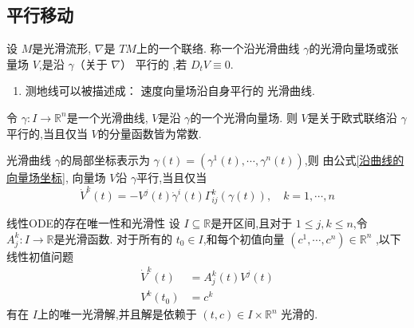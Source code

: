 \documentclass[../../main.tex]{subfiles}
\begin{document}
\subsection{平行移动}

\begin{definition}
    设 \(  M  \)是光滑流形, \(   \nabla   \)是 \(  TM  \)上的一个联络.
    称一个沿光滑曲线 \(   \gamma   \)的光滑向量场或张量场 \(  V  \),是沿 \(   \gamma   \)（关于 \(   \nabla   \)） 平行的       ,若 \(  D_{t}V \equiv 0  \). 
\end{definition}

\begin{remark}
    \begin{enumerate}
        \item 测地线可以被描述成： 速度向量场沿自身平行的 光滑曲线.
    \end{enumerate}
    
\end{remark}
\begin{example}
    令 \(   \gamma :I\to \mathbb{R} ^{n}  \)是一个光滑曲线, \(  V  \)是沿 \(   \gamma   \)的一个光滑向量场.
    则 \(  V  \)是关于欧式联络沿 \(   \gamma   \)平行的,当且仅当 \(  V  \)的分量函数皆为常数.      
\end{example}

\hspace*{\fill} 

\begin{proposition}
    光滑曲线 \(   \gamma   \)的局部坐标表示为 \(   \gamma \left( t \right) =  \left(  \gamma ^{1}\left( t \right),\cdots , \gamma ^{n}\left( t \right)   \right)    \),则
    由公式\ref{沿曲线的向量场坐标},
    向量场 \(  V  \)沿 \(   \gamma   \)平行,当且仅当 \[
    \dot{V}^{k}\left( t \right) =  -V^{j}\left( t \right)  \dot{\gamma}^{i}\left( t \right) \Gamma _{ij}^{k}\left(  \gamma \left( t \right)  \right)    ,\quad  k=  1,\cdots,n 
    \]     
\end{proposition}


\begin{theorem}{线性ODE的存在唯一性和光滑性}
    设 \(  I\subseteq \mathbb{R}   \)是开区间,且对于 \(  1\le j,k\le n  \),令 \(  A_{j}^{k}:I\to \mathbb{R}   \)是光滑函数.
    对于所有的 \(  t_0 \in I  \),和每个初值向量 \(  \left(  c^1,\cdots,c^n  \right)\in \mathbb{R} ^{n}   \)     ,以下线性初值问题 \[
    \begin{aligned}
    \dot{V}^{k}\left( t \right)& =  A_{j}^{k}\left( t \right)V^{j}\left( t \right)\\ 
     V^{k}\left( t_0 \right)& =  c^{k}     
    \end{aligned}
    \]有在 \(  I  \)上的唯一光滑解,并且解是依赖于 \(  \left( t,c \right) \in I\times \mathbb{R} ^{n}   \)  光滑的.
\end{theorem}
\end{document}
